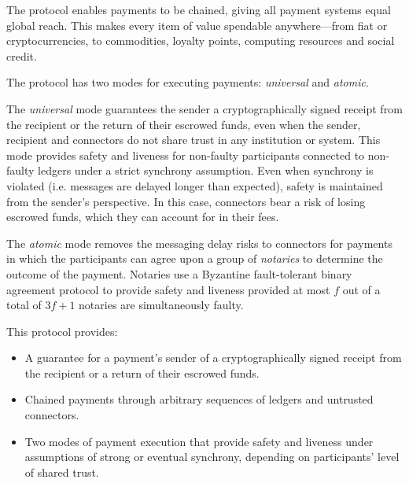 \documentclass[letterpaper,twocolumn,10pt]{article}
\begin{document}
The protocol enables payments to be chained, giving all payment systems equal global reach. This makes every item of value spendable anywhere---from fiat or cryptocurrencies, to commodities, loyalty points, computing resources and social credit.

The protocol has two modes for executing payments: \textit{universal} and \textit{atomic}.

The \textit{universal} mode guarantees the sender a cryptographically signed receipt from the recipient or the return of their escrowed funds, even when the sender, recipient and connectors do not share trust in any institution or system. This mode provides safety and liveness for non-faulty participants connected to non-faulty ledgers under a strict synchrony assumption. Even when synchrony is violated (i.e. messages are delayed longer than expected), safety is maintained from the sender's perspective. In this case, connectors bear a risk of losing escrowed funds, which they can account for in their fees.


The \textit{atomic} mode removes the messaging delay risks to connectors for payments in which the participants can agree upon a group of \textit{notaries} to determine the outcome of the payment. Notaries use a Byzantine fault-tolerant binary agreement protocol to provide safety and liveness provided at most $f$ out of a total of $3f + 1$ notaries are simultaneously faulty.


This protocol provides:
\begin{itemize}
\item A guarantee for a payment's sender of a cryptographically signed receipt from the recipient or a return of their escrowed funds.
\item Chained payments through arbitrary sequences of ledgers and untrusted connectors.
\item Two modes of payment execution that provide safety and liveness under assumptions of strong or eventual synchrony, depending on participants' level of shared trust.
\end{itemize}
\end{document}
